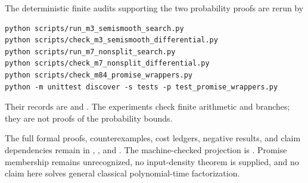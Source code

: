 \documentclass[11pt]{article}
\begin{document}
The deterministic finite audits supporting the two probability proofs are
rerun by
\begin{verbatim}
python scripts/run_m3_semismooth_search.py
python scripts/check_m3_semismooth_differential.py
python scripts/run_m7_nonsplit_search.py
python scripts/check_m7_nonsplit_differential.py
python scripts/check_m84_promise_wrappers.py
python -m unittest discover -s tests -p test_promise_wrappers.py
\end{verbatim}
Their records are
 and
.  The experiments
check finite arithmetic and branches; they are not proofs of the probability
bounds.

The full formal proofs, counterexamples, cost ledgers, negative results, and
claim dependencies remain in \archivepaper,
, and .
The machine-checked projection is
.  Promise membership remains
unrecognized, no input-density theorem is supplied, and no claim here solves
general classical polynomial-time factorization.


\small

\end{document}
